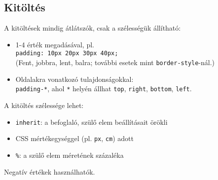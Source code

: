 \subsection{Kitöltés}

\begin{frame}
  A kitöltések mindig átlátszók, csak a szélességük állítható:
  \begin{itemize}
    \item 1-4 érték megadásával, pl.\\
    \texttt{padding: 10px 20px 30px 40px;}\\
    (Fent, jobbra, lent, balra; további esetek mint \texttt{border-style}-nál.)
    \item Oldalakra vonatkozó tulajdonságokkal:\\
      \texttt{padding-*}, ahol \texttt{*} helyén állhat 
      \texttt{top}, \texttt{right}, \texttt{bottom}, \texttt{left}.
  \end{itemize}
\end{frame}

\begin{frame}
  A kitöltés szélessége lehet:
  \begin{itemize}
    \item \texttt{inherit}: a befoglaló, szülő elem beállításait örökli
    \item CSS mértékegységgel (pl. \texttt{px}, \texttt{cm}) adott
    \item \texttt{\%}: a szülő elem méretének százaléka
  \end{itemize}
  \vfill
  Negatív értékek  használhatók.
\end{frame}
